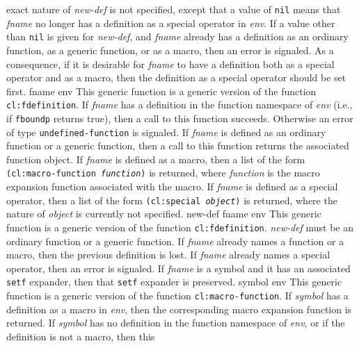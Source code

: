 exact nature of \textit{new-def} is not specified, except that a value
of \texttt{nil} means that \textit{fname} no longer has a definition
as a special operator in \textit{env}.
\vskip -0.05cm
If a value other than \texttt{nil} is given for \textit{new-def}, and
\textit{fname} already has a definition as an ordinary function, as a
generic function, or as a macro, then an error is signaled.  As a
consequence, if it is desirable for \textit{fname} to have a
definition both as a special operator and as a macro, then the
definition as a special operator should be set first.
\vskip -0.05cm
 {fname env}
\vskip -0.2cm
This generic function is a generic version of the \commonlisp{}
function \texttt{cl:fdefinition}.
\vskip -0.05cm
If \textit{fname} has a definition in the function namespace of
\textit{env} (i.e., if \texttt{fboundp} returns true), then a call to
this function succeeds.  Otherwise an error of type
\texttt{undefined-function} is signaled.
\vskip -0.05cm
If \textit{fname} is defined as an ordinary function or a generic
function, then a call to this function returns the associated
function object.
\vskip -0.05cm
If \textit{fname} is defined as a macro, then a list of the form
\texttt{(cl:macro-function \textrm{\textit{function}})} is returned, where
\textit{function} is the macro expansion function associated with the
macro.
\vskip -0.05cm
If \textit{fname} is defined as a special operator, then a list of the
form \texttt{(cl:special \textrm{\textit{object}})} is returned, where
  the nature of \textit{object} is currently not specified.
\vskip -0.05cm
 {new-def fname env}
\vskip -0.2cm
This generic function is a generic version of the \commonlisp{}
function \texttt{cl:fdefinition}.
\vskip -0.05cm
\textit{new-def} must be an ordinary function or a generic function.
If \textit{fname} already names a function or a macro, then the
previous definition is lost.  If \textit{fname} already names a
special operator, then an error is signaled.
\vskip -0.05cm
If \textit{fname} is a symbol and it has an associated \texttt{setf}
expander, then that \texttt{setf} expander is preserved.
\vskip -0.05cm
 {symbol env}
\vskip -0.2cm
This generic function is a generic version of the \commonlisp{}
function \texttt{cl:macro-function}.
\vskip -0.05cm
If \textit{symbol} has a definition as a macro in \textit{env}, then the
corresponding macro expansion function is returned.
\vskip -0.05cm
If \textit{symbol} has no definition in the function namespace of
\textit{env}, or if the definition is not a macro, then this
